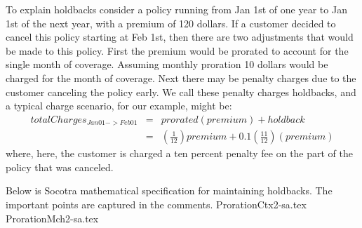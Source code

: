 To explain holdbacks consider a policy running from Jan 1st of one year to Jan 1st of the next year, with a
premium of 120 dollars. If
a customer decided to cancel this policy starting at Feb 1st, then there are two adjustments that would
be made to this policy. First the premium would be prorated to account for the single month of coverage.
Assuming monthly proration 10 dollars would be charged for the month of coverage. Next there may be penalty
charges due to the customer canceling the policy early. We call these penalty charges holdbacks, and a typical
charge scenario, for our example, might be:
\begin{eqnarray*}
totalCharges_{Jan01->Feb01} & = & prorated(premium) + holdback \\
                          & = & (\frac{1}{12}) premium + 0.1(\frac{11}{12})(premium)
\end{eqnarray*}
where, here, the customer is charged a ten percent penalty fee on the part of the policy that was canceled.


Below is Socotra mathematical specification for maintaining holdbacks. The important points are captured in
the comments.
{ProrationCtx2-sa.tex}
{ProrationMch2-sa.tex}

